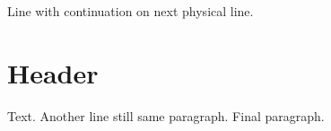 \documentclass{article}
\begin{document}
Line with %
continuation on next physical line.
\section{Header} %
Text. Another line%
still same paragraph.
Final paragraph.
\end{document}
